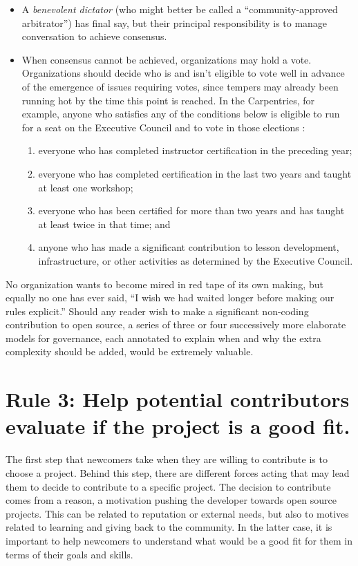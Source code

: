 \documentclass[10pt,letterpaper]{article}
\newcommand{\rulemajor}[1]{\section{#1}}
\begin{document}
\begin{itemize}

\item
  A \emph{benevolent dictator} (who might better be called a ``community-approved arbitrator'') has final say,
  but their principal responsibility is to manage conversation to achieve consensus.

\item
  When consensus cannot be achieved,
  organizations may hold a vote.
  Organizations should decide who is and isn't eligible to vote well in advance of the emergence of issues requiring votes,
  since tempers may already been running hot by the time this point is reached.
  In the Carpentries,
  for example,
  anyone who satisfies any of the conditions below is eligible to run for a seat on the Executive Council
  and to vote in those elections \cite{carpentries-bylaws}:
  \begin{enumerate}
    \item everyone who has completed instructor certification in the preceding year;
    \item everyone who has completed certification in the last two years and taught at least one workshop;
    \item everyone who has been certified for more than two years and has taught at least twice in that time; and
    \item anyone who has made a significant contribution to lesson development, infrastructure, or other activities as determined by the Executive Council.
  \end{enumerate}

\end{itemize}

No organization wants to become mired in red tape of its own making,
but equally no one has ever said,
``I wish we had waited longer before making our rules explicit.''
Should any reader wish to make a significant non-coding contribution to open source,
a series of three or four successively more elaborate models for governance,
each annotated to explain when and why the extra complexity should be added, would be extremely valuable.

\rulemajor{Rule 3: Help potential contributors evaluate if the project is a good fit.}

The first step that newcomers take when they are willing to contribute is to choose a project.
Behind this step,
there are different forces acting that may lead them to decide to contribute to a specific project.
The decision to contribute comes from a reason,
a motivation pushing the developer towards open source projects.
This can be related to reputation or external needs,
but also to motives related to learning and giving back to the community.
In the latter case,
it is important to help newcomers to understand what would be a good fit for them in terms of their goals and skills.
\end{document}
